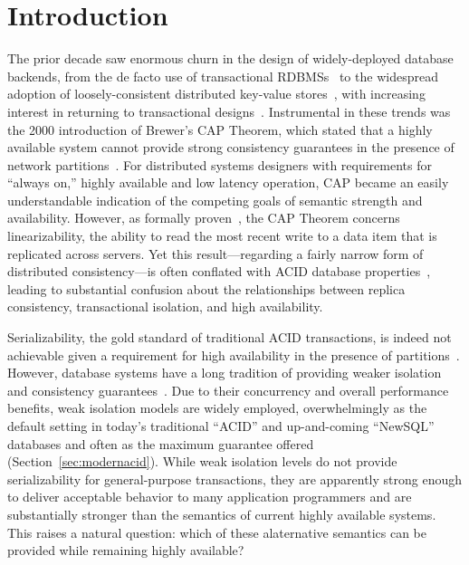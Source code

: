 
\section{Introduction}

The prior decade saw enormous churn in the design of widely-deployed
database backends, from the de facto use of transactional
RDBMSs~\cite{bernstein-concurrency, bernstein-book, gray-isolation,
  gray-virtues} to the widespread adoption of loosely-consistent
distributed key-value stores~\cite{bigtable, pnuts, dynamo}, with
increasing interest in returning to transactional
designs~\cite{spanner, walter, foundation-article, krikellas-bargain,
  eiger}. Instrumental in these trends was the 2000 introduction of
Brewer's CAP Theorem, which stated that a highly available system
cannot provide strong consistency guarantees in the presence of
network partitions~\cite{brewer-slides}. For distributed systems
designers with requirements for ``always on,'' highly available and
low latency operation, CAP became an easily understandable indication
of the competing goals of semantic strength and availability. However,
as formally proven~\cite{gilbert-cap}, the CAP Theorem concerns
linearizability, the ability to read the most recent write to a data
item that is replicated across servers. Yet this result---regarding a
fairly narrow form of distributed consistency---is often conflated
with ACID database properties~\cite{brewer-slides, hn,
  foundation-article}, leading to substantial confusion about the
relationships between replica consistency, transactional isolation, and high
availability.

Serializability, the gold standard of traditional ACID transactions,
is indeed not achievable given a requirement for high availability in
the presence of partitions~\cite{davidson-survey}. However, database
systems have a long tradition of providing weaker isolation and
consistency guarantees~\cite{adya, ansicritique, gray-isolation,
  gray-virtues}. Due to their concurrency and overall performance
benefits, weak isolation models are widely employed, overwhelmingly as
the default setting in today's traditional ``ACID'' and up-and-coming
``NewSQL'' databases and often as the maximum guarantee offered
(Section~\ref{sec:modernacid}). While weak isolation levels do not
provide serializability for general-purpose transactions, they are
apparently strong enough to deliver acceptable behavior to many
application programmers and are substantially stronger than the
semantics of current highly available systems. This raises a natural
question: which of these alaternative semantics can be provided while
remaining highly available?

